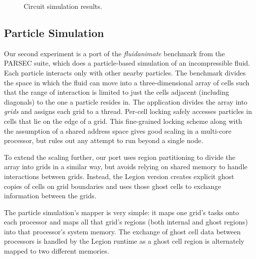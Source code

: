 \begin{figure}
\caption{Circuit simulation results.}
\end{figure}

\subsection{Particle Simulation}
\label{subsec:exp_fluid}

Our second experiment is a port of the \emph{fluidanimate} benchmark
from the PARSEC suite\cite{bienia11benchmarking}, which does a
particle-based simulation of an incompressible fluid.  Each particle
interacts only with other nearby particles. The benchmark divides the
space in which the fluid can move into a three-dimensional array of
cells such that the range of interaction is limited to just the cells
adjacent (including diagonals) to the one a particle resides in.  The
application divides the array into {\em grids} and assigns each grid to
a thread.  Per-cell locking safely accesses particles in
cells that lie on the edge of a grid.  This fine-grained locking
scheme along with the assumption of a shared address space gives
good scaling in a multi-core processor, but rules out any attempt to run
beyond a single node.

To extend the scaling further, our port uses region partitioning to
divide the array into grids in a similar way, but avoids relying
on shared memory to handle interactions between grids.
Instead, the Legion version creates
explicit ghost copies of cells on grid boundaries and uses
those ghost cells to exchange information between the grids.

The particle simulation's mapper is very simple: it maps one grid's
tasks onto each processor and maps all that grid's regions (both
internal and ghost regions) into that processor's system memory.  The
exchange of ghost cell data between processors is handled by the
Legion runtime as a ghost cell region is alternately mapped to two
different memories.

